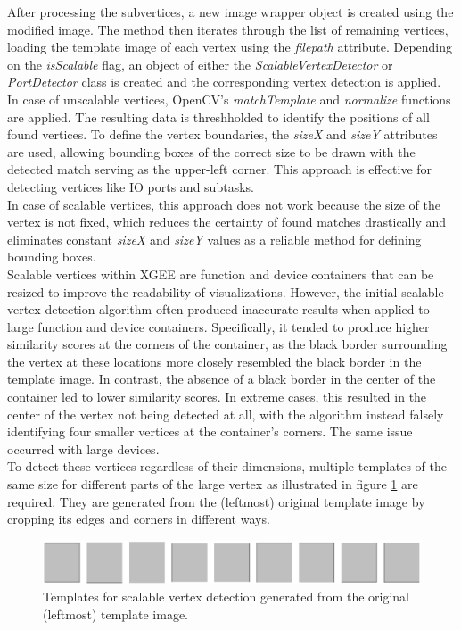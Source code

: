 After processing the subvertices, a new image wrapper object is created using the modified image. The method then iterates through the list of remaining vertices, loading the template image of each vertex using the \textit{filepath} attribute. Depending on the \textit{isScalable} flag, an object of either the \textit{ScalableVertexDetector} or \textit{PortDetector} class is created and the corresponding vertex detection is applied.\\
In case of unscalable vertices, OpenCV's \textit{matchTemplate} and \textit{normalize} functions are applied. The resulting data is threshholded to identify the positions of all found vertices. To define the vertex boundaries, the \textit{sizeX} and \textit{sizeY} attributes are used, allowing bounding boxes of the correct size to be drawn with the detected match serving as the upper-left corner. This approach is effective for detecting vertices like IO ports and subtasks.\\
In case of scalable vertices, this approach does not work because the size of the vertex is not fixed, which reduces the certainty of found matches drastically and eliminates constant \textit{sizeX} and \textit{sizeY} values as a reliable method for defining bounding boxes.\\
Scalable vertices within XGEE are function and device containers that can be resized to improve the readability of visualizations. However, the initial scalable vertex detection algorithm often produced inaccurate results when applied to large function and device containers. Specifically, it tended to produce higher similarity scores at the corners of the container, as the black border surrounding the vertex at these locations more closely resembled the black border in the template image. In contrast, the absence of a black border in the center of the container led to lower similarity scores. In extreme cases, this resulted in the center of the vertex not being detected at all, with the algorithm instead falsely identifying four smaller vertices at the container's corners. The same issue occurred with large devices.\\
To detect these vertices regardless of their dimensions, multiple templates of the same size for different parts of the large vertex as illustrated in figure \ref{fig_templates} are required. They are generated from the (leftmost) original template image by cropping its edges and corners in different ways.
\begin{figure}[h]
    \centering
    \includegraphics[width=0.85\linewidth]{Pictures/templates.png}
    \caption{Templates for scalable vertex detection generated from the original (leftmost) template image.}
    \label{fig_templates}
\end{figure}
